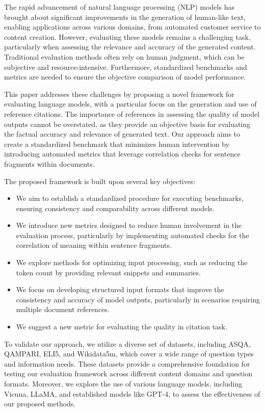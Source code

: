 The rapid advancement of natural language processing (NLP) models has brought about significant improvements in the generation of human-like text, enabling applications across various domains, from automated customer service to content creation. However, evaluating these models remains a challenging task, particularly when assessing the relevance and accuracy of the generated content. Traditional evaluation methods often rely on human judgment, which can be subjective and resource-intensive. Furthermore, standardized benchmarks and metrics are needed to ensure the objective comparison of model performance.

This paper addresses these challenges by proposing a novel framework for evaluating language models, with a particular focus on the generation and use of reference citations. The importance of references in assessing the quality of model outputs cannot be overstated, as they provide an objective basis for evaluating the factual accuracy and relevance of generated text. Our approach aims to create a standardized benchmark that minimizes human intervention by introducing automated metrics that leverage correlation checks for sentence fragments within documents.

The proposed framework is built upon several key objectives:
\begin{itemize}
\item We aim to establish a standardized procedure for executing benchmarks, ensuring consistency and comparability across different models.
\item We introduce new metrics designed to reduce human involvement in the evaluation process, particularly by implementing automated checks for the correlation of meaning within sentence fragments.
\item We explore methods for optimizing input processing, such as reducing the token count by providing relevant snippets and summaries.
\item We focus on developing structured input formats that improve the consistency and accuracy of model outputs, particularly in scenarios requiring multiple document references.
\item We suggest a new metric for evaluating the quality in citation task.
\end{itemize}

To validate our approach, we utilize a diverse set of datasets, including ASQA, QAMPARI, ELI5, and Wikidata5m, which cover a wide range of question types and information needs. These datasets provide a comprehensive foundation for testing our evaluation framework across different content domains and question formats. Moreover, we explore the use of various language models, including Vicuna, LLaMA, and established models like GPT-4, to assess the effectiveness of our proposed methods.

